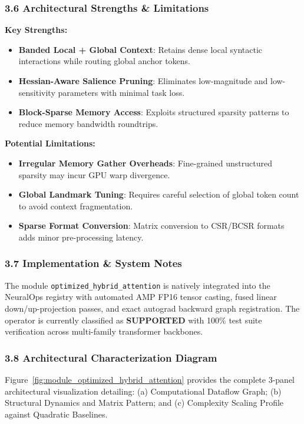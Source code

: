 \subsubsection*{3.6 Architectural Strengths \& Limitations}
\textbf{Key Strengths:}
\begin{itemize}
    \item \textbf{Banded Local + Global Context}: Retains dense local syntactic interactions while routing global anchor tokens.
    \item \textbf{Hessian-Aware Salience Pruning}: Eliminates low-magnitude and low-sensitivity parameters with minimal task loss.
    \item \textbf{Block-Sparse Memory Access}: Exploits structured sparsity patterns to reduce memory bandwidth roundtrips.
\end{itemize}

\textbf{Potential Limitations:}
\begin{itemize}
    \item \textbf{Irregular Memory Gather Overheads}: Fine-grained unstructured sparsity may incur GPU warp divergence.
    \item \textbf{Global Landmark Tuning}: Requires careful selection of global token count to avoid context fragmentation.
    \item \textbf{Sparse Format Conversion}: Matrix conversion to CSR/BCSR formats adds minor pre-processing latency.
\end{itemize}

\subsubsection*{3.7 Implementation \& System Notes}
The module \texttt{optimized\_hybrid\_attention} is natively integrated into the NeuralOps registry with automated AMP FP16 tensor casting, fused linear down/up-projection passes, and exact autograd backward graph registration. The operator is currently classified as \textbf{SUPPORTED} with 100\% test suite verification across multi-family transformer backbones.

\subsubsection*{3.8 Architectural Characterization Diagram}
Figure~\ref{fig:module_optimized_hybrid_attention} provides the complete 3-panel architectural visualization detailing: (a) Computational Dataflow Graph; (b) Structural Dynamics and Matrix Pattern; and (c) Complexity Scaling Profile against Quadratic Baselines.

